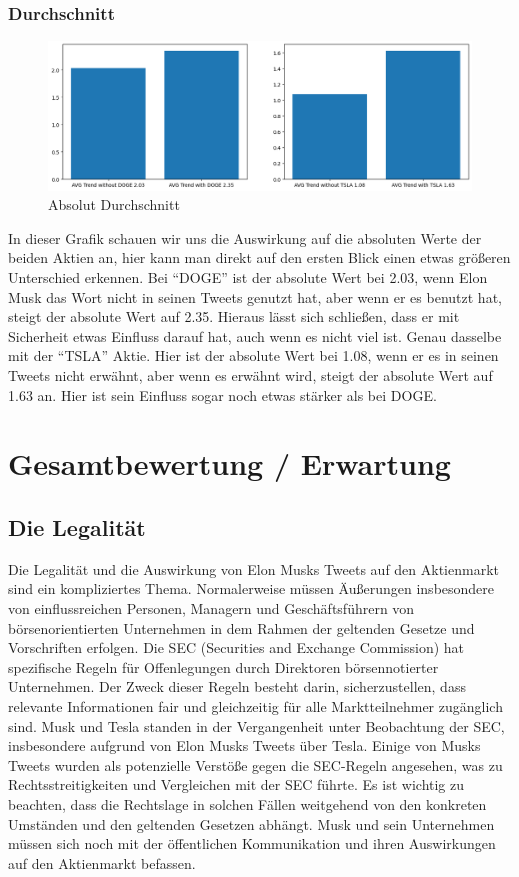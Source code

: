 \documentclass{article}
\begin{document}
\subsubsection{Durchschnitt}
\begin{figure}[!htb]
  	\includegraphics[width=\textwidth, center]{./imgs/Absolut_Durchschnitt.png}
 	\caption{Absolut Durchschnitt}
 	\label{fig:Absolut Durchschnitt}
\end{figure}
In dieser Grafik schauen wir uns die Auswirkung auf die absoluten Werte der beiden Aktien an, hier kann man direkt auf den ersten Blick einen etwas größeren Unterschied erkennen.
Bei ``DOGE'' ist der absolute Wert bei 2.03, wenn Elon Musk das Wort nicht in seinen Tweets genutzt hat, aber wenn er es benutzt hat, steigt der absolute Wert auf 2.35. Hieraus lässt sich schließen, dass er mit Sicherheit etwas Einfluss darauf hat, auch wenn es nicht viel ist.
Genau dasselbe mit der ``TSLA'' Aktie. Hier ist der absolute Wert bei 1.08, wenn er es in seinen Tweets nicht erwähnt, aber wenn es erwähnt wird, steigt der absolute Wert auf 1.63 an. Hier ist sein Einfluss sogar noch etwas stärker als bei DOGE.




\section{Gesamtbewertung / Erwartung}

\subsection{Die Legalität}
Die Legalität und die Auswirkung von Elon Musks Tweets auf den Aktienmarkt sind ein kompliziertes Thema. Normalerweise müssen Äußerungen insbesondere von einflussreichen Personen, Managern und Geschäftsführern von börsenorientierten Unternehmen in dem Rahmen der geltenden Gesetze und Vorschriften erfolgen.
Die SEC (Securities and Exchange Commission) hat spezifische Regeln für Offenlegungen durch
Direktoren börsennotierter Unternehmen. Der Zweck dieser Regeln besteht darin, sicherzustellen,
dass relevante Informationen fair und gleichzeitig für alle Marktteilnehmer zugänglich sind. Musk und Tesla standen in der Vergangenheit unter Beobachtung der SEC, insbesondere aufgrund von Elon Musks Tweets über Tesla. Einige von Musks Tweets wurden als potenzielle Verstöße gegen die SEC-Regeln angesehen, was zu Rechtsstreitigkeiten und Vergleichen mit der SEC führte. Es ist wichtig zu beachten, dass die Rechtslage in solchen Fällen weitgehend von den konkreten Umständen und den
geltenden Gesetzen abhängt. Musk und sein Unternehmen müssen sich noch mit der öffentlichen
Kommunikation und ihren Auswirkungen auf den Aktienmarkt befassen.
\end{document}
